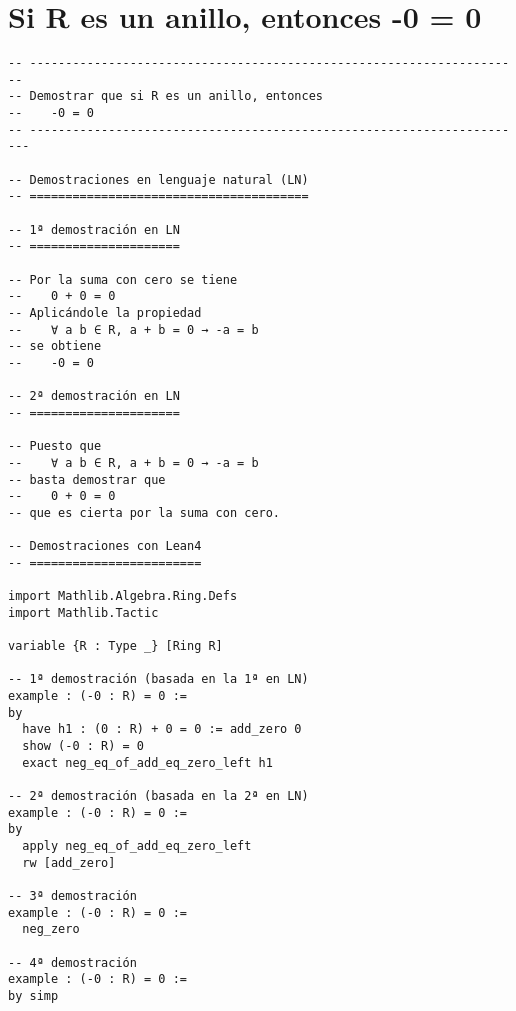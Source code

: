 \section{Si R es un anillo, entonces -0 = 0}
\label{sec:org09181e6}
\begin{verbatim}
-- ---------------------------------------------------------------------
-- Demostrar que si R es un anillo, entonces
--    -0 = 0
-- ----------------------------------------------------------------------

-- Demostraciones en lenguaje natural (LN)
-- =======================================

-- 1ª demostración en LN
-- =====================

-- Por la suma con cero se tiene
--    0 + 0 = 0
-- Aplicándole la propiedad
--    ∀ a b ∈ R, a + b = 0 → -a = b
-- se obtiene
--    -0 = 0

-- 2ª demostración en LN
-- =====================

-- Puesto que
--    ∀ a b ∈ R, a + b = 0 → -a = b
-- basta demostrar que
--    0 + 0 = 0
-- que es cierta por la suma con cero.

-- Demostraciones con Lean4
-- ========================

import Mathlib.Algebra.Ring.Defs
import Mathlib.Tactic

variable {R : Type _} [Ring R]

-- 1ª demostración (basada en la 1ª en LN)
example : (-0 : R) = 0 :=
by
  have h1 : (0 : R) + 0 = 0 := add_zero 0
  show (-0 : R) = 0
  exact neg_eq_of_add_eq_zero_left h1

-- 2ª demostración (basada en la 2ª en LN)
example : (-0 : R) = 0 :=
by
  apply neg_eq_of_add_eq_zero_left
  rw [add_zero]

-- 3ª demostración
example : (-0 : R) = 0 :=
  neg_zero

-- 4ª demostración
example : (-0 : R) = 0 :=
by simp
\end{verbatim}


